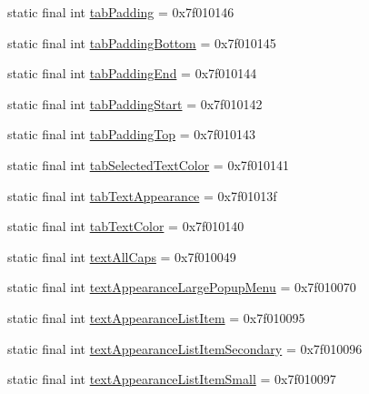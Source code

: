\begin{CompactItemize}
\item 
static final int \hyperlink{classandroid_1_1support_1_1v7_1_1palette_1_1_r_1_1attr_39a7ec07351bf775742d66f2eb4baa53}{tabPadding} = 0x7f010146
\item 
static final int \hyperlink{classandroid_1_1support_1_1v7_1_1palette_1_1_r_1_1attr_e878e63b667e692480ba9515a05524c8}{tabPaddingBottom} = 0x7f010145
\item 
static final int \hyperlink{classandroid_1_1support_1_1v7_1_1palette_1_1_r_1_1attr_675dfc781b47a679d0ea48ef1c858b83}{tabPaddingEnd} = 0x7f010144
\item 
static final int \hyperlink{classandroid_1_1support_1_1v7_1_1palette_1_1_r_1_1attr_cb834b02d94e79ae0aa89ed28b6382fd}{tabPaddingStart} = 0x7f010142
\item 
static final int \hyperlink{classandroid_1_1support_1_1v7_1_1palette_1_1_r_1_1attr_e727ee6319f3ac3efd3b6b7b0481baea}{tabPaddingTop} = 0x7f010143
\item 
static final int \hyperlink{classandroid_1_1support_1_1v7_1_1palette_1_1_r_1_1attr_e757482995ca560c77b99bba98952513}{tabSelectedTextColor} = 0x7f010141
\item 
static final int \hyperlink{classandroid_1_1support_1_1v7_1_1palette_1_1_r_1_1attr_0f963680444adaa6b37de97f584c2a95}{tabTextAppearance} = 0x7f01013f
\item 
static final int \hyperlink{classandroid_1_1support_1_1v7_1_1palette_1_1_r_1_1attr_72fac60bcc123b4cb6ee7b58e1189bfa}{tabTextColor} = 0x7f010140
\item 
static final int \hyperlink{classandroid_1_1support_1_1v7_1_1palette_1_1_r_1_1attr_0188970906288c74666161f85c57838f}{textAllCaps} = 0x7f010049
\item 
static final int \hyperlink{classandroid_1_1support_1_1v7_1_1palette_1_1_r_1_1attr_22fc1075fb77d692099ca88c9eecee52}{textAppearanceLargePopupMenu} = 0x7f010070
\item 
static final int \hyperlink{classandroid_1_1support_1_1v7_1_1palette_1_1_r_1_1attr_0b3aabd11375a340071efe2d336d0a43}{textAppearanceListItem} = 0x7f010095
\item 
static final int \hyperlink{classandroid_1_1support_1_1v7_1_1palette_1_1_r_1_1attr_cfe2dab401b54526a39a8cc52291af4c}{textAppearanceListItemSecondary} = 0x7f010096
\item 
static final int \hyperlink{classandroid_1_1support_1_1v7_1_1palette_1_1_r_1_1attr_1c38fd8065424d9e1267ba75d93ebc55}{textAppearanceListItemSmall} = 0x7f010097
\item 

\end{CompactItemize}

